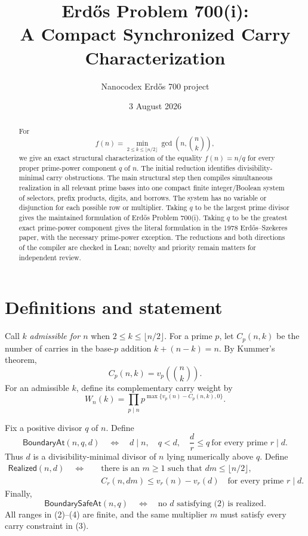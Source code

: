 \documentclass[11pt]{article}
\title{Erd\H{o}s Problem 700(i):\\
A Compact Synchronized Carry Characterization}
\author{Nanocodex Erd\H{o}s 700 project}
\date{3 August 2026}
\theoremstyle{remark}
\newcommand{\choosef}[2]{\binom{#1}{#2}}
\newcommand{\BoundaryAt}{\mathsf{BoundaryAt}}
\newcommand{\Realized}{\mathsf{Realized}}
\newcommand{\BoundarySafeAt}{\mathsf{BoundarySafeAt}}
\begin{document}
\maketitle

\begin{abstract}
For
\[
 f(n)=\min_{2\leq k\leq \lfloor n/2\rfloor}
       \gcd\!\left(n,\choosef nk\right),
\]
we give an exact structural characterization of the equality $f(n)=n/q$
for every proper prime-power component $q$ of $n$.  The initial reduction
identifies divisibility-minimal carry obstructions.  The main structural step
then compiles simultaneous realization in all relevant prime bases into one
compact finite integer/Boolean system of selectors, prefix products, digits,
and borrows.  The system has no variable or disjunction for each possible
row or multiplier.  Taking $q$ to be the largest prime divisor gives the
maintained formulation of Erd\H{o}s Problem 700(i).  Taking $q$ to be the
greatest exact prime-power component gives the literal formulation in the
1978 Erd\H{o}s--Szekeres paper, with the necessary prime-power exception.
The reductions and both directions of the compiler are checked in Lean;
novelty and priority remain matters for independent review.
\end{abstract}

\section{Definitions and statement}

Call $k$ \emph{admissible for $n$} when
$2\leq k\leq\lfloor n/2\rfloor$.  For a prime $p$, let
$C_p(n,k)$ be the number of carries in the base-$p$ addition
$k+(n-k)=n$.  By Kummer's theorem,
\[
 C_p(n,k)=v_p\!\left(\choosef nk\right).
\]
For an admissible $k$, define its complementary carry weight by
\[
 W_n(k)=\prod_{p\mid n}p^{\max\{v_p(n)-C_p(n,k),0\}}.       \tag{1}
\]

Fix a positive divisor $q$ of $n$.  Define
\[
 \BoundaryAt(n,q,d)
 \quad\Longleftrightarrow\quad
 d\mid n,\quad q<d,\quad
 \frac d r\leq q\ \text{for every prime }r\mid d.          \tag{2}
\]
Thus $d$ is a divisibility-minimal divisor of $n$ lying numerically above
$q$.  Define
\begin{equation}
 \begin{split}
 \Realized(n,d)\quad\Longleftrightarrow\quad
 &\text{there is an }m\geq1\text{ such that }dm\leq\lfloor n/2\rfloor,\\
 &C_r(n,dm)\leq v_r(n)-v_r(d)
   \quad\text{for every prime }r\mid d.
 \end{split}
\tag{3}
\end{equation}
Finally,
\[
 \BoundarySafeAt(n,q)
 \quad\Longleftrightarrow\quad
 \text{no }d\text{ satisfying (2) is realized}.            \tag{4}
\]
All ranges in (2)--(4) are finite, and the same multiplier $m$ must satisfy
every carry constraint in (3).
\end{document}
